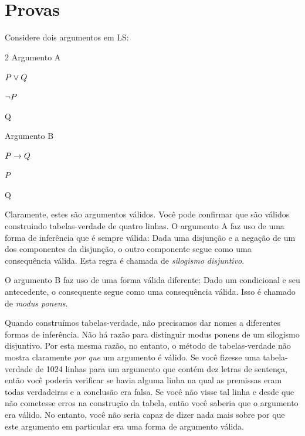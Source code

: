 \chapter{Provas}
\label{ch.proofs}

Considere dois argumentos em LS:

\begin{multicols}{2}
Argumento A
\begin{earg}
\item[] $P \vee Q$
\item[] $\neg P$
\item[\therefore] Q
\end{earg}

Argumento B
\begin{earg}
\item[] $P \rightarrow Q$
\item[] $P$
\item[\therefore] Q
\end{earg}

\end{multicols}

Claramente, estes são argumentos válidos. Você pode confirmar que são válidos construindo tabelas-verdade de quatro linhas. O argumento A faz uso de uma forma de inferência que é sempre válida: Dada uma disjunção e a negação de um dos componentes da disjunção, o outro componente segue como uma consequência válida. Esta regra é chamada de \emph{silogismo disjuntivo}.

O argumento B faz uso de uma forma válida diferente: Dado um condicional e seu antecedente, o consequente segue como uma consequência válida. Isso é chamado de \emph{modus ponens}.

Quando construímos tabelas-verdade, não precisamos dar nomes a diferentes formas de inferência. Não há razão para distinguir modus ponens de um silogismo disjuntivo. Por esta mesma razão, no entanto, o método de tabelas-verdade não mostra claramente \emph{por que} um argumento é válido. Se você fizesse uma tabela-verdade de 1024 linhas para um argumento que contém dez letras de sentença, então você poderia verificar se havia alguma linha na qual as premissas eram todas verdadeiras e a conclusão era falsa. Se você não visse tal linha e desde que não cometesse erros na construção da tabela, então você saberia que o argumento era válido. No entanto, você não seria capaz de dizer nada mais sobre por que este argumento em particular era uma forma de argumento válida.

